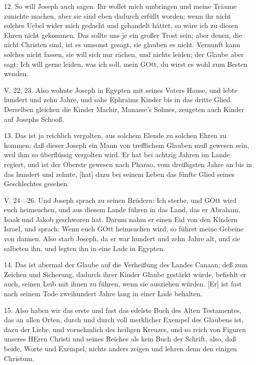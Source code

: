 12. So will Joseph auch sagen: Ihr wollet mich umbringen und meine Träume zunichte machen, aber sie sind eben dadurch erfüllt worden; wenn ihr nicht solches Uebel wider mich gedacht und gehandelt hättet, so wäre ich zu diesen Ehren nicht gekommen. Das sollte uns je ein großer Trost sein; aber denen, die nicht Christen sind, ist es umsonst gesagt, sie glauben es nicht. Vernunft kann solches nicht fassen, sie will sich nur rächen, und nichts leiden; der Glaube aber sagt: Ich will gerne leiden, was ich soll, mein GOtt, du wirst es wohl zum Besten wenden.

\begin{schriftzitat}
V. 22, 23. Also wohnte Joseph in Egypten mit seines Vaters Hause, und lebte hundert und zehn Jahre, und sahe Ephraims Kinder bis in das dritte Glied. Derselben gleichen die Kinder Machir, Manasse’s Sohnes, zeugeten auch Kinder auf Josephs Schooß.
\end{schriftzitat}

13. Das ist ja reichlich vergolten, aus solchem Elende zu solchen Ehren zu kommen; daß dieser Joseph ein Mann von trefflichem Glauben muß gewesen sein, weil ihm so überflüssig vergolten wird. Er hat bei achtzig Jahren im Lande regiert, und ist der Oberste gewesen nach Pharao, vom dreißigsten Jahre an bis in das hundert und zehnte, [hat] dazu bei seinem Leben das fünfte Glied seines Geschlechtes gesehen.

\begin{schriftzitat}
V. 24—26. Und Joseph sprach zu seinen Brüdern: Ich sterbe, und GOtt wird euch heimsuchen, und aus diesem Lande führen in das Land, das er Abraham, Isaak und Jakob geschworen hat. Darum nahm er einen Eid von den Kindern Israel, und sprach: Wenn euch GOtt heimsuchen wird, so führet meine Gebeine von dannen. Also starb Joseph, da er war hundert und zehn Jahre alt, und sie salbeten ihn, und legten ihn in eine Lade in Egypten.
\end{schriftzitat}

14. Das ist abermal der Glaube auf die Verheißung des Landes Canaan; deß zum Zeichen und Sicherung, dadurch ihrer Kinder Glaube gestärkt würde, befiehlt er auch, seinen Leib mit ihnen zu führen, wenn sie ausziehen würden. [Er] ist fast nach seinem Tode zweihundert Jahre lang in einer Lade behalten.

15. Also haben wir das erste und fast das edelste Buch des Alten Testamentes, das an allen Orten, durch und durch voll merklicher Exempel des Glaubens ist, dazu der Liebe, und vornehmlich des heiligen Kreuzes, und so reich von Figuren unseres HErrn Christi und seines Reiches als kein Buch der Schrift, also, daß beide, Worte und Exempel, nichts anders zeigen und lehren denn den einigen Christum.

